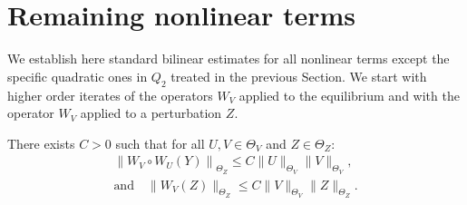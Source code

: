 \documentclass[AHL, Unicode, longabstracts,published]{cedram}
\begin{document}
\section{Remaining nonlinear terms}\label{sec:remaining}


We establish here standard bilinear estimates for all nonlinear terms except the specific quadratic ones in $Q_2$ treated in the previous Section. We start with higher order iterates of the operators $W_V$ applied to the equilibrium and with the operator $W_V$ applied to a perturbation $Z$.


\begin{lemm}\label{prop:QuadCl2}
There exists $C>0$ such that for all $U,V \in \Theta_V$ and $Z\in \Theta_Z $:
\begin{multline} \label{bd:quadperturbation}
\left\|W_V\circ W_U(Y)\right\|_{\Theta_Z} \leq C \|U\|_{\Theta_V} \|V\|_{\Theta_V}, \\
\text{and} \quad \|W_V(Z)\|_{\Theta_Z} \leq C \|V\|_{\Theta_V} \|Z\|_{\Theta_Z}.
\end{multline}
\end{lemm}
\end{document}
